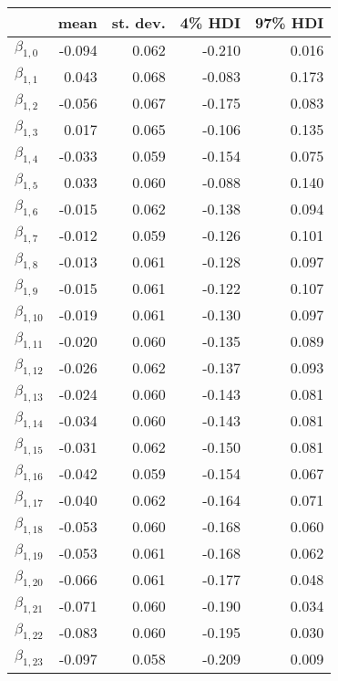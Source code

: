 \begin{tabular}{lrrrr}
\toprule
{} &   mean &  st. dev. &  4\% HDI &  97\% HDI \\
\midrule
$\beta_{1,0}$  & -0.094 &     0.062 &   -0.210 &     0.016 \\
$\beta_{1,1}$  &  0.043 &     0.068 &   -0.083 &     0.173 \\
$\beta_{1,2}$  & -0.056 &     0.067 &   -0.175 &     0.083 \\
$\beta_{1,3}$  &  0.017 &     0.065 &   -0.106 &     0.135 \\
$\beta_{1,4}$  & -0.033 &     0.059 &   -0.154 &     0.075 \\
$\beta_{1,5}$  &  0.033 &     0.060 &   -0.088 &     0.140 \\
$\beta_{1,6}$  & -0.015 &     0.062 &   -0.138 &     0.094 \\
$\beta_{1,7}$  & -0.012 &     0.059 &   -0.126 &     0.101 \\
$\beta_{1,8}$  & -0.013 &     0.061 &   -0.128 &     0.097 \\
$\beta_{1,9}$  & -0.015 &     0.061 &   -0.122 &     0.107 \\
$\beta_{1,10}$ & -0.019 &     0.061 &   -0.130 &     0.097 \\
$\beta_{1,11}$ & -0.020 &     0.060 &   -0.135 &     0.089 \\
$\beta_{1,12}$ & -0.026 &     0.062 &   -0.137 &     0.093 \\
$\beta_{1,13}$ & -0.024 &     0.060 &   -0.143 &     0.081 \\
$\beta_{1,14}$ & -0.034 &     0.060 &   -0.143 &     0.081 \\
$\beta_{1,15}$ & -0.031 &     0.062 &   -0.150 &     0.081 \\
$\beta_{1,16}$ & -0.042 &     0.059 &   -0.154 &     0.067 \\
$\beta_{1,17}$ & -0.040 &     0.062 &   -0.164 &     0.071 \\
$\beta_{1,18}$ & -0.053 &     0.060 &   -0.168 &     0.060 \\
$\beta_{1,19}$ & -0.053 &     0.061 &   -0.168 &     0.062 \\
$\beta_{1,20}$ & -0.066 &     0.061 &   -0.177 &     0.048 \\
$\beta_{1,21}$ & -0.071 &     0.060 &   -0.190 &     0.034 \\
$\beta_{1,22}$ & -0.083 &     0.060 &   -0.195 &     0.030 \\
$\beta_{1,23}$ & -0.097 &     0.058 &   -0.209 &     0.009 \\

\end{tabular}
